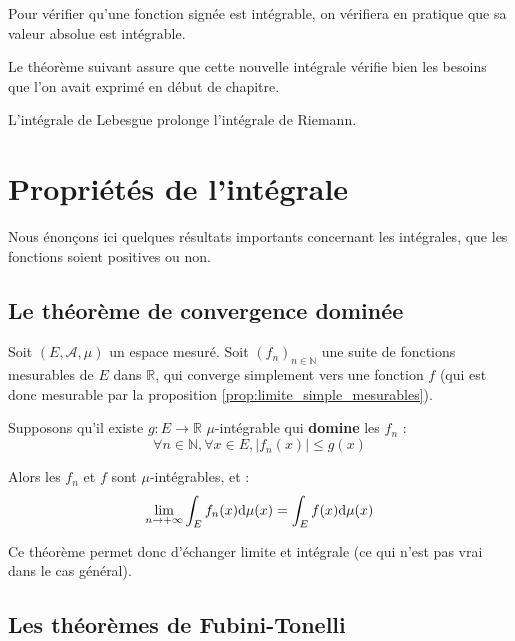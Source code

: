 \documentclass[../integ-proba.tex]{subfiles}
\begin{document}
  \begin{rem}
    Pour vérifier qu'une fonction signée est intégrable, on vérifiera en pratique que sa valeur absolue est intégrable.
  \end{rem}

  Le théorème suivant assure que cette nouvelle intégrale vérifie bien les besoins que l'on avait exprimé en début de chapitre.

  \begin{thm}
    L'intégrale de Lebesgue prolonge l'intégrale de Riemann.
  \end{thm}

  \section{Propriétés de l'intégrale}

  Nous énonçons ici quelques résultats importants concernant les intégrales, que les fonctions soient positives ou non.

  \subsection{Le théorème de convergence dominée}

  \begin{thm}
    \label{thm:convergence_dominee}
    Soit $\left(E,\mathcal{A},\mu\right)$ un espace mesuré.
    Soit $\left(f_n\right)_{n \in \mathbb{N}}$ une suite de fonctions mesurables de $E$ dans $\mathbb{R}$, qui converge simplement vers une fonction $f$ (qui est donc mesurable par la proposition \ref{prop:limite_simple_mesurables}).

    Supposons qu'il existe $g:E \longrightarrow \mathbb{R}$ $\mu$-intégrable qui \textbf{domine} les $f_n$ :
    $$
    \forall n \in \mathbb{N}, \forall x \in E, \left|f_n(x)\right| \leq g(x)
    $$

    Alors les $f_n$ et $f$ sont $\mu$-intégrables, et :
    $$
    \lim_{n \to + \infty} \int_E f_n(x) \textnormal{d}\mu(x) = \int_E f(x) \textnormal{d}\mu(x)
    $$
  \end{thm}

  \begin{rem}
    Ce théorème permet donc d'échanger limite et intégrale (ce qui n'est pas vrai dans le cas général).
  \end{rem}

  \subsection{Les théorèmes de Fubini-Tonelli}
\end{document}
